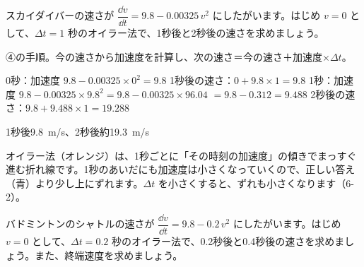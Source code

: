 \begin{reidai}
スカイダイバーの速さが $\dfrac{\dd v}{\dd t}=9.8-0.00325\,v^2$ にしたがいます。はじめ $v=0$ として、$\Delta t=1$ 秒のオイラー法で、1秒後と2秒後の速さを求めましょう。\par
\kangaekata ④の手順。今の速さから加速度を計算し、次の速さ＝今の速さ＋加速度×$\Delta t$。\par
\shiki 0秒：加速度 $9.8-0.00325\times0^2=9.8$\bkvifq
1秒後の速さ：$0+9.8\times1=9.8$\bkvifq
1秒：加速度 $9.8-0.00325\times9.8^2=9.8-0.00325\times96.04$\bkvifq
\hspace*{3\zw}$=9.8-0.312=9.488$\bkvifq
2秒後の速さ：$9.8+9.488\times1=19.288$\par
\kotae 1秒後\qty{9.8}{m/s}、2秒後約\qty{19.3}{m/s}
\end{reidai}
\noindent\begin{minipage}[c]{0.5\linewidth}
\end{minipage}\hfill
\begin{minipage}[c]{0.46\linewidth}\raggedright
オイラー法（オレンジ）は、1秒ごとに「その時刻の加速度」の傾きでまっすぐ進む折れ線です。1秒のあいだにも加速度は小さくなっていくので、正しい答え（青）より少し上にずれます。$\Delta t$ を小さくすると、ずれも小さくなります（6-2）。
\end{minipage}
\par\vspace{4pt}

\begin{jibun}
バドミントンのシャトルの速さが $\dfrac{\dd v}{\dd t}=9.8-0.2\,v^2$ にしたがいます。はじめ $v=0$ として、$\Delta t=0.2$ 秒のオイラー法で、0.2秒後と0.4秒後の速さを求めましょう。また、終端速度を求めましょう。
\end{jibun}


